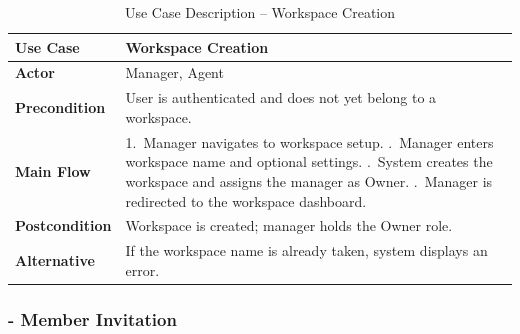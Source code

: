 \documentclass[12pt,a4paper]{report}
\newcommand{\reporttablesetup}{%
  \small%
  \setlength{\tabcolsep}{5pt}%
  \renewcommand{\arraystretch}{1.38}%
  \arrayrulecolor{framegray}%
}
\begin{document}
\begin{table}[H]
  \centering
  \renewcommand{\arraystretch}{1.3}
  \reporttablesetup
  \begin{tabularx}{\textwidth}{|>{\bfseries}p{3.1cm}|Y|}
    \hline
    Use Case      & Workspace Creation \\
    \hline
    Actor         & Manager, Agent \\
    \hline
    Precondition  & User is authenticated and does not yet belong to a workspace. \\
    \hline
    Main Flow     & 1.\ Manager navigates to workspace setup. .\ Manager enters workspace name and optional settings. .\ System creates the workspace and assigns the manager as Owner. .\ Manager is redirected to the workspace dashboard. \\
    \hline
    Postcondition & Workspace is created; manager holds the Owner role. \\
    \hline
    Alternative   & If the workspace name is already taken, system displays an error. \\
    \hline
  \end{tabularx}
  \caption{Use Case Description -- Workspace Creation}
  \label{tab:uc02}
\end{table}

\subsubsection{- Member Invitation}
\end{document}
